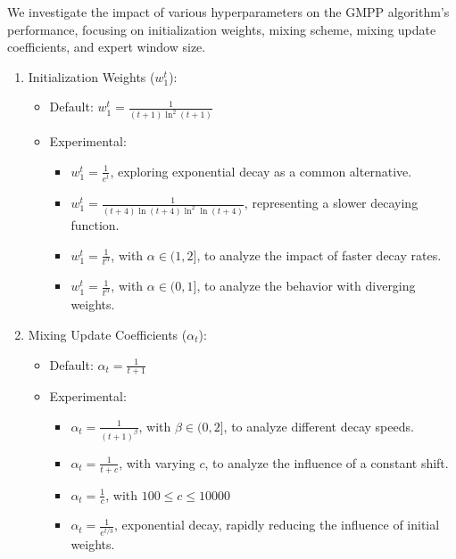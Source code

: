 \documentclass[12pt, twoside]{article}
\begin{document}
We investigate the impact of various hyperparameters on the GMPP algorithm's performance, focusing on initialization weights, mixing scheme, mixing update coefficients, and expert window size. 
\begin{enumerate}
\item Initialization Weights ($w_1^t$):
\begin{itemize}
\item Default: $w_1^t = \frac{1}{(t+1)\ln^2(t+1)}$
\item Experimental: 
\begin{itemize}
\item $w_1^t = \frac{1}{e^t}$, exploring exponential decay as a common alternative.
\item $w_1^t = \frac{1}{(t+4)\ln(t+4)\ln^2\ln(t+4)}$, representing a slower decaying function.
\item $w_1^t = \frac{1}{t^\alpha}$, with $\alpha \in (1, 2]$, to analyze the impact of faster decay rates.
\item $w_1^t = \frac{1}{t^\alpha}$, with $\alpha \in (0, 1]$, to analyze the behavior with diverging weights.


\end{itemize}
\end{itemize}


\contourlength{0.1pt}

\item Mixing Update Coefficients ($\alpha_t$):
\begin{itemize}
\item Default: $\alpha_t = \frac{1}{t+1}$
\item Experimental: 
\begin{itemize}
\item $\alpha_t = \frac{1}{(t+1)^\beta}$, with $\beta \in (0, 2]$, to analyze different decay speeds.
\item $\alpha_t = \frac{1}{t+c}$, with varying $c$, to analyze the influence of a constant shift.
\item $\alpha_t = \frac{1}{c}$, with $100 \le c \le10000$
\item $\alpha_t = \frac{1}{e^{t/3}}$, exponential decay, rapidly reducing the influence of initial weights.         

\end{itemize}


\end{itemize}


\end{enumerate}
\end{document}
